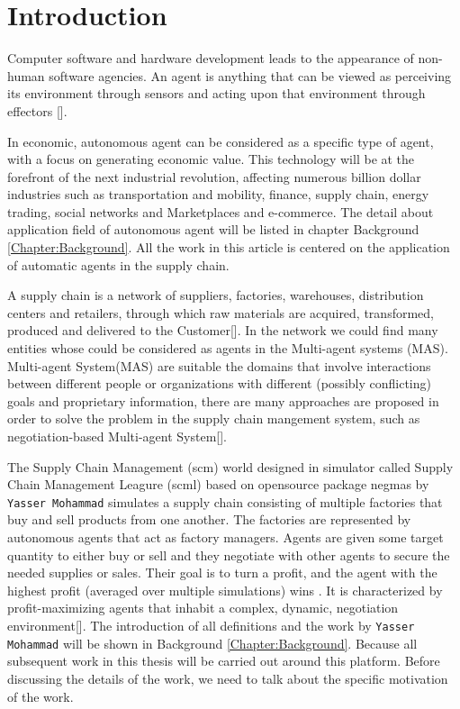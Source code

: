 \chapter{Introduction}
Computer software and hardware development leads to the appearance of non-human software agencies. An agent is anything that can be viewed as perceiving its environment through sensors and acting upon that environment through effectors [].

In economic, autonomous agent can be considered as a specific type of agent, with a focus on generating economic value. This technology will be at the forefront of the next industrial revolution, affecting numerous billion dollar industries such as transportation and mobility, finance, supply chain, energy trading, social networks and Marketplaces and e-commerce. The detail about application field of autonomous agent will be listed in chapter Background \ref{Chapter:Background}. All the work in this article is centered on the application of automatic agents in the supply chain.

A supply chain is a network of suppliers, factories, warehouses, distribution centers and retailers, through which raw materials are acquired, transformed, produced and delivered to the Customer[]. In the network we could find many entities whose could be considered as agents in the Multi-agent systems (MAS). Multi-agent System(MAS) are suitable the domains that involve interactions between different people or organizations with different (possibly conflicting) goals and proprietary information, there are many approaches are proposed in order to solve the problem in the supply chain mangement system, such as negotiation-based Multi-agent System[].

The Supply Chain Management (\gls{scm}) world designed in simulator called Supply Chain Management Leagure (\gls{scml}) based on opensource package \gls{negmas} by \texttt{Yasser Mohammad} simulates a supply chain consisting of multiple factories that buy and sell products from one another. The factories are represented by autonomous agents that act as factory managers. Agents are given some target quantity to either buy or sell and they negotiate with other agents to secure the needed supplies or sales. Their goal is to turn a profit, and the agent with the highest profit (averaged over multiple simulations) wins \parencite{Mohammad2019}. It is characterized by profit-maximizing agents that inhabit a complex, dynamic, negotiation environment[]. The introduction of all definitions and the work by \texttt{Yasser Mohammad} will be shown in Background \ref{Chapter:Background}. Because all subsequent work in this thesis will be carried out around this platform. Before discussing the details of the work, we need to talk about the specific motivation of the work.

